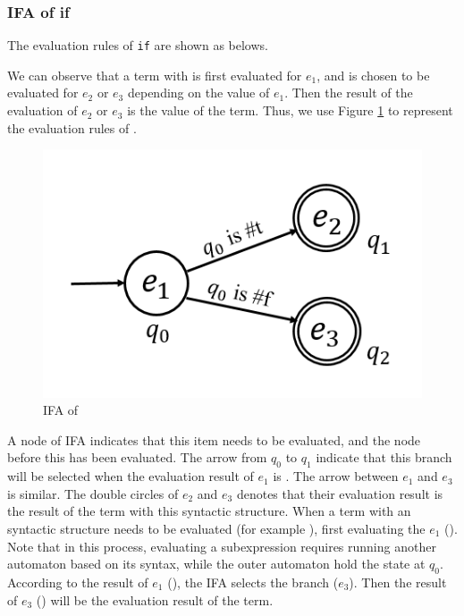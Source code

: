 \subsubsection{IFA of if}

The evaluation rules of \texttt{if} are shown as belows.

We can observe that a term with  is first evaluated for $e_1$, and is chosen to be evaluated for $e_2$ or $e_3$ depending on the value of $e_1$. Then the result of the evaluation of $e_2$ or $e_3$ is the value of the term. Thus, we use Figure \ref{fig:ifa-if} to represent the evaluation rules of .

\begin{figure}[t]
	\centering
	\includegraphics[scale=0.3]{images/ifa-if.png}
	\caption{IFA of }
	\label{fig:ifa-if}
\end{figure}

A node of IFA indicates that this item needs to be evaluated, and the node before this has been evaluated. The arrow from $q_0$ to $q_1$ indicate that this branch will be selected when the evaluation result of $e_1$ is . The arrow between $e_1$ and $e_3$ is similar. The double circles of $e_2$ and $e_3$ denotes that their evaluation result is the result of the term with this syntactic structure. When a term with an  syntactic structure needs to be evaluated (for example ), first evaluating the $e_1$ (). Note that in this process, evaluating a subexpression requires running another automaton based on its syntax, while the outer automaton hold the state at $q_0$. According to the result of $e_1$ (), the IFA selects the branch ($e_3$). Then the result of $e_3$ () will be the evaluation result of the term.

